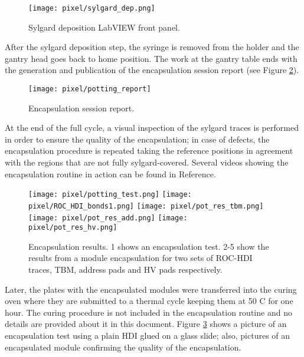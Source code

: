 \begin{figure}[h]
\begin{center}
  \texttt{[image: pixel/sylgard\_dep.png]}
  \caption{Sylgard deposition LabVIEW front panel.}\label{fig:sylgard_dep}
\end{center}
\end{figure}

After the sylgard deposition step, the syringe is removed from the holder and the gantry head goes back to home position. The work at the gantry table ends with the generation and publication of the encapsulation session report (see Figure \ref{fig:potting_report}).   

\begin{figure}[h]
\begin{center}
  \texttt{[image: pixel/potting\_report]}
 \caption[Encapsulation session report.]{Encapsulation session report.}\label{fig:potting_report}
\end{center}
\end{figure}

At the end of the full cycle, a visual inspection of the sylgard traces is performed in order to ensure the quality of the encapsulation; in case of defects, the encapsulation procedure is repeated taking the reference positions in agreement with the regions that are not fully sylgard-covered. Several videos showing the encapsulation routine in action can be found in Reference\cite{jmonroy_channel}.

\begin{figure}[h]
\begin{center}
  \texttt{[image: pixel/potting\_test.png]}
  \texttt{[image: pixel/ROC\_HDI\_bonds1.png]}
  \texttt{[image: pixel/pot\_res\_tbm.png]}
  \texttt{[image: pixel/pot\_res\_add.png]}
  \texttt{[image: pixel/pot\_res\_hv.png]}
  \caption[Encapsulation results.]{Encapsulation results. 1 shows an encapsulation test. 2-5 show the results from a module encapsulation for two sets of ROC-HDI traces, TBM, address pads and HV pads respectively.}\label{fig:potted_module}
\end{center}
\end{figure}

Later, the plates with the encapsulated modules were transferred into the curing oven where they are submitted to a thermal cycle keeping them at 50 C for one hour. The curing procedure is not included in the encapsulation routine and no details are provided about it in this document. Figure \ref{fig:potted_module} shows a picture of an encapsulation test using a plain HDI glued on a glass slide; also, pictures of an encapsulated module confirming the quality of the encapsulation.  

